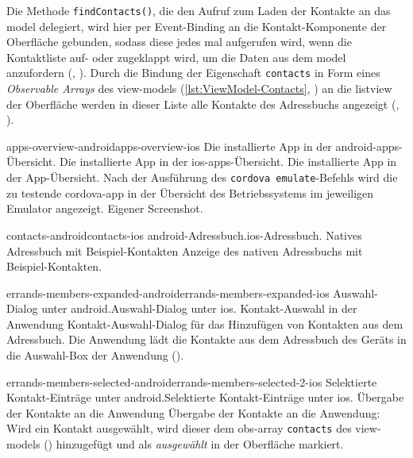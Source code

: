 
Die Methode \lstinline|findContacts()|, die den Aufruf zum Laden der Kontakte an das \gls{model} delegiert, wird hier per Event-Binding an die Kontakt-Komponente der Oberfläche gebunden, sodass diese jedes mal aufgerufen wird, wenn die Kontaktliste auf- oder zugeklappt wird, um die Daten aus dem \gls{model} anzufordern (, ).
Durch die Bindung der Eigenschaft \lstinline|contacts| in Form eines \emph{Observable Arrays} des \glspl{view-model} (\autoref{lst:ViewModel-Contacts}, ) an die \gls{listview} der Oberfläche werden in dieser Liste alle Kontakte des Adressbuchs angezeigt (, ).

	
	\pagebreak
	
	{apps-overview-android}{apps-overview-ios}
	{Die installierte App in der \gls{android}-\glspl{app}-Übersicht.}
	{Die installierte App in der \gls{ios}-\glspl{app}-Übersicht.}
	{Die installierte App in der App-Übersicht.}
	{Nach der Ausführung des \lstinline|cordova emulate|-Befehls wird die zu testende \gls{cordova}-\gls{app} in der Übersicht des Betriebssystems im jeweiligen Emulator angezeigt.}
	{Eigener Screenshot.}
	
	{contacts-android}{contacts-ios}
	{\gls{android}-Adressbuch.}{\gls{ios}-Adressbuch.}
	{Natives Adressbuch mit Beispiel-Kontakten}
	{Anzeige des nativen Adressbuchs mit Beispiel-Kontakten.}
	{\ownScreenshot}
	
	{errands-members-expanded-android}{errands-members-expanded-ios}
	{Auswahl-Dialog unter \gls{android}.}{Auswahl-Dialog unter \gls{ios}.}
	{Kontakt-Auswahl in der Anwendung}
	{Kontakt-Auswahl-Dialog für das Hinzufügen von Kontakten aus dem Adressbuch. Die Anwendung lädt die Kontakte aus dem Adressbuch des Geräts in die Auswahl-Box der Anwendung ().}
	{\ownScreenshot}
	
	{errands-members-selected-android}{errands-members-selected-2-ios}
	{Selektierte Kontakt-Einträge unter \gls{android}.}{Selektierte Kontakt-Einträge unter \gls{ios}.}
	{Übergabe der Kontakte an die Anwendung}
	{Übergabe der Kontakte an die Anwendung: Wird ein Kontakt ausgewählt, wird dieser dem \gls{obs}-\gls{array} \lstinline|contacts| des \glspl{view-model} () hinzugefügt und als \emph{ausgewählt} in der Oberfläche markiert.}
	{\ownScreenshot}
	
